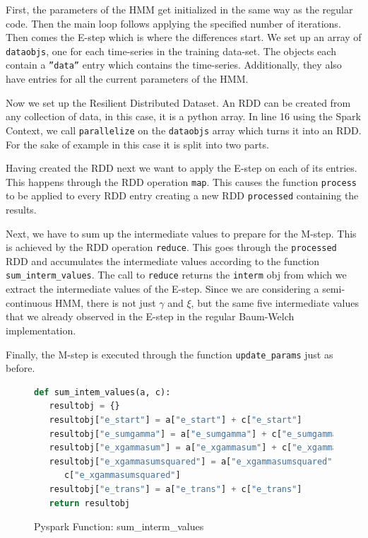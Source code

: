 First, the parameters of the HMM get initialized in the same way as the regular code. Then the main loop follows applying the specified number of iterations. Then comes the E-step which is where the differences start. We set up an array of \texttt{dataobjs}, one for each time-series in the training data-set. The objects each contain a \texttt{''data''} entry which contains the time-series. Additionally, they also have entries for all the current parameters of the HMM. 

Now we set up the Resilient Distributed Dataset. An RDD can be created from any collection of data, in this case, it is a python array. In line 16 using the Spark Context, we call \texttt{parallelize} on the \texttt{dataobjs} array which turns it into an RDD. For the sake of example in this case it is split into two parts. 

Having created the RDD next we want to apply the E-step on each of its entries. This happens through the RDD operation \texttt{map}. This causes the function \texttt{process} to be applied to every RDD entry creating a new RDD \texttt{processed} containing the results. 

Next, we have to sum up the intermediate values to prepare for the M-step. This is achieved by the RDD operation \texttt{reduce}. This goes through the \texttt{processed} RDD and accumulates the intermediate values according to the function \texttt{sum\_interm\_values}. The call to \texttt{reduce} returns the \texttt{interm} obj from which we extract the intermediate values of the E-step. Since we are considering a semi-continuous HMM, there is not just $\gamma$ and $\xi$, but the same five intermediate values that we already observed in the E-step in the regular Baum-Welch implementation. 

Finally, the M-step is executed through the function \texttt{update\_params} just as before. 

\newpage

\begin{figure}
\begin{singlespace}
\begin{lstlisting}[language=Python]
def sum_intem_values(a, c):
   resultobj = {}
   resultobj["e_start"] = a["e_start"] + c["e_start"]
   resultobj["e_sumgamma"] = a["e_sumgamma"] + c["e_sumgamma"]
   resultobj["e_xgammasum"] = a["e_xgammasum"] + c["e_xgammasum"]
   resultobj["e_xgammasumsquared"] = a["e_xgammasumsquared"] + \
      c["e_xgammasumsquared"]
   resultobj["e_trans"] = a["e_trans"] + c["e_trans"]
   return resultobj
\end{lstlisting}
\end{singlespace}
\caption{Pyspark Function: sum\_interm\_values}    
\label{fig:pyspark-sum-listing}
\end{figure}

